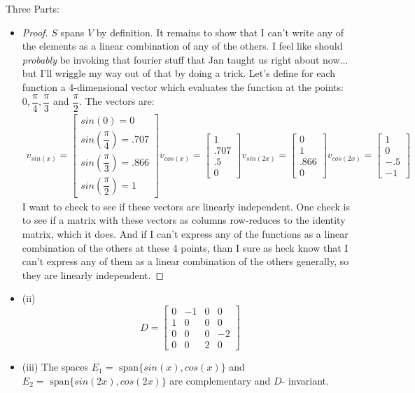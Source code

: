 \documentclass[12pt]{amsart}
\newenvironment{problem}[2][Problem]{\begin{trivlist}
\item[\hskip \labelsep {\bfseries #1}\hskip \labelsep {\bfseries #2.}]}{\end{trivlist}}
\begin{document}
\begin{problem}{8} Three Parts:
\begin{itemize}
\item
\begin{proof}
$S$ spans $V$ by definition. It remains to show that I can't write any of the elements as a linear combination of any of the others. I feel like should \textit{probably} be invoking that fourier stuff that Jan taught us right about now... but I'll wriggle my way out of that by doing a trick. Let's define for each function a 4-dimensional vector which evaluates the function at the points: $0 ,\dfrac{\pi}{4}, \dfrac{\pi}{3}$ and $\dfrac{\pi}{2}$. The vectors are:
\begin{align*}
v_{sin(x)} = \begin{bmatrix}
sin(0) = 0 \\
sin(\dfrac{\pi}{4}) = .707 \\
sin(\dfrac{\pi}{3}) = .866 \\
sin(\dfrac{\pi}{2}) = 1
\end{bmatrix}
v_{cos(x)} = \begin{bmatrix}
1 \\
.707 \\
.5 \\
0
\end{bmatrix}
v_{sin(2x)} = \begin{bmatrix}
0 \\
1 \\
.866 \\
0
\end{bmatrix}
v_{cos(2x)} = \begin{bmatrix}
1 \\
0\\
-.5 \\
-1
\end{bmatrix}
\end{align*}
I want to check to see if these vectors are linearly independent. One check is to see if a matrix with these vectors as columns row-reduces to the identity matrix, which it does. And if I can't express any of the functions as a linear combination of the others at these 4 points, than I sure as heck know that I can't express any of them as a linear combination of the others generally, so they are linearly independent.
\end{proof}
\item (ii) $$
D = \begin{bmatrix}
0 & -1 & 0 & 0 \\
1 & 0 & 0 & 0 \\
0 & 0 & 0 & -2 \\
0 & 0 & 2 & 0
\end{bmatrix}
$$
\item (iii) The spaces $E_1 = \text{ span} \{ sin(x), cos(x) \}$ and $E_2 = \text{ span} \{ sin(2x), cos(2x) \}$ are complementary and $D$- invariant.
\end{itemize}
\end{problem}
\end{document}
